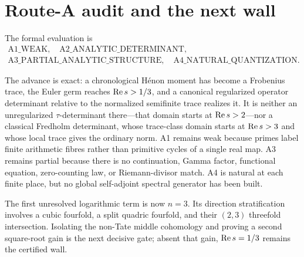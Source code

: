 \section{Route-A audit and the next wall}

The formal evaluation is
\[
\begin{gathered}
\mathrm{A1\_WEAK},\quad
\mathrm{A2\_ANALYTIC\_DETERMINANT},\\
\mathrm{A3\_PARTIAL\_ANALYTIC\_STRUCTURE},\quad
\mathrm{A4\_NATURAL\_QUANTIZATION}.
\end{gathered}
\]

The advance is exact: a chronological H\'enon moment has become a Frobenius
trace, the Euler germ reaches \(\operatorname{Re} s>1/3\), and a canonical regularized
operator determinant relative to the normalized semifinite trace realizes
it.  It is neither an unregularized \(\tau\)-determinant there---that domain
starts at \(\operatorname{Re} s>2\)---nor a classical Fredholm determinant, whose
trace-class domain starts at \(\operatorname{Re} s>3\) and whose local trace gives the
ordinary norm.  A1 remains weak because primes label finite arithmetic fibres
rather than primitive cycles of a single real map.  A3 remains partial
because there is no continuation, Gamma factor, functional equation,
zero-counting law, or Riemann-divisor match.  A4 is natural at each finite
place, but no global self-adjoint spectral generator has been built.

The first unresolved logarithmic term is now \(n=3\).  Its direction
stratification involves a cubic fourfold, a split quadric fourfold, and their
\((2,3)\) threefold intersection.  Isolating the non-Tate middle cohomology and
proving a second square-root gain is the next decisive gate; absent that gain,
\(\operatorname{Re} s=1/3\) remains the certified wall.
